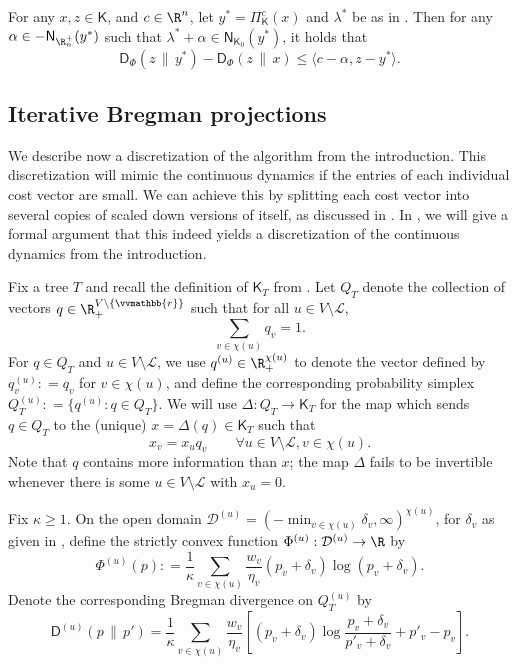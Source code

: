 \documentclass{toc}
\newcommand{\calD}{\mathcal D}
\newcommand{\calL}{\mathcal L}
\newcommand{\dmid}{\,\|\,}
\newcommand{\vvr}{\vvmathbb{r}}
\newcommand{\seteq}{\mathrel{\mathop:}=}
\newcommand{\sfD}{\mathsf D}
\newcommand{\sfK}{\mathsf K}
\newcommand{\sfN}{\mathsf N}
\begin{document}
\begin{lemma}\label{lem:bp}
	For any $x, z \in \sfK$, and $c \in \R^n$, let $y^* = \Pi_{\sfK}^c(x)$ and $\lambda^*$
	be as in .
	Then for any $\alpha \in -\sfN_{\R^+_n}(y^*)$ such that $\lambda^* + \alpha \in \sfN_{\sfK_0}(y^*)$,
	it holds that
	\[
	\sfD_{\Phi}(z \dmid y^*) - \sfD_{\Phi}(z \dmid x) \leq \langle c-\alpha, z-y^*\rangle.
	\]
\end{lemma}

\subsection{Iterative Bregman projections}
\label{sec:iter}

We describe now a discretization of the algorithm from the introduction. This discretization will mimic the continuous dynamics if the entries of each individual cost vector are small. We can achieve this by splitting each cost vector into several copies of scaled down versions of itself, as discussed in . In , we will give a formal argument that this indeed yields a discretization of the continuous dynamics from the introduction.

Fix a tree $T$ and recall the definition of $\sfK_T$ from .
Let $Q_{T}$ denote the collection of vectors $q \in \R_+^{V \setminus \{\vvr\}}$ such that
for all $u \in V \setminus \calL$,
\[
\sum_{v \in \chi(u) } q_v = 1.
\]
For $q \in Q_T$ and $u \in V \setminus \calL$, we use $q^{(u)} \in \R_+^{\chi(u)}$ to denote the vector
defined by $q^{(u)}_v \seteq q_v$ for $v \in \chi(u)$, and define
the corresponding probability simplex
$Q^{(u)}_T \seteq \{ q^{(u)} : q \in Q_T \}$.
We will use $\Delta : Q_T \to \sfK_T$ for the map which sends $q \in Q_T$ to the (unique) $x = \Delta(q) \in \sfK_T$ such that
\[
x_v = x_u q_v \qquad \forall u \in V \setminus \calL, v \in \chi(u).
\]
Note that $q$ contains more information than $x$; the map $\Delta$ fails to be invertible whenever 
there is some $u \in V \setminus \calL$ with $x_u = 0$.

Fix $\kappa \ge 1$. On the open domain $\calD^{(u)}=(-\min_{v\in\chi(u)}\delta_v,\infty)^{\chi(u)}$, for $\delta_v$ as given in , define the strictly convex function $\Phi^{(u)} : \calD^{(u)} \to \R$ by
\[
\Phi^{(u)}(p) \seteq \frac{1}{\kappa} \sum_{v \in \chi(u)} \frac{w_v}{\eta_v} \left(p_v + \delta_v\right) \log \left(p_v + \delta_v\right).
\]
Denote the corresponding Bregman divergence on $Q^{(u)}_T$ by
\[
\sfD^{(u)}\!\left(p \dmid p' \right) = \frac{1}{\kappa} \sum_{v \in \chi(u)} \frac{w_v}{\eta_v} \left[\left(p_v + \delta_v\right) \log \frac{p_v+\delta_v}{p'_v+\delta_v}
+ p'_v-p_v\right].
\]
\end{document}
